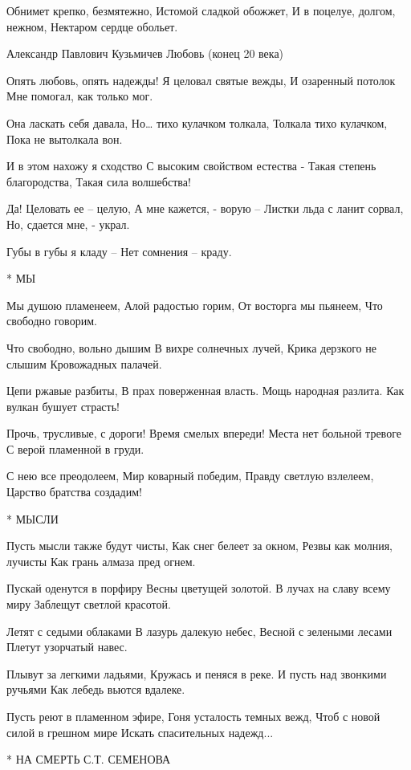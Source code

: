 Обнимет крепко, безмятежно,
Истомой сладкой обожжет,
И в поцелуе, долгом, нежном,
Нектаром сердце обольет.

Александр Павлович Кузьмичев
Любовь (конец 20 века)

Опять любовь, опять надежды!
Я целовал святые вежды,
И озаренный потолок
Мне помогал, как только мог.

Она ласкать себя давала,
Но… тихо кулачком толкала,
Толкала тихо кулачком,
Пока не вытолкала вон.

И в этом нахожу я сходство
С высоким свойством естества -
Такая степень благородства,
Такая сила волшебства!

Да! Целовать ее – целую,
А мне кажется, - ворую –
Листки льда с ланит сорвал,
Но, сдается мне, - украл.

Губы в губы я кладу –
Нет сомнения – краду.


* МЫ

Мы душою пламенеем,
Алой радостью горим,
От восторга мы пьянеем,
Что свободно говорим.

Что свободно, вольно дышим
В вихре солнечных лучей,
Крика дерзкого не слышим
Кровожадных палачей.

Цепи ржавые разбиты,
В прах поверженная власть.
Мощь народная разлита.
Как вулкан бушует страсть!

Прочь, трусливые, с дороги!
Время смелых впереди!
Места нет больной тревоге
С верой пламенной в груди.

С нею все преодолеем,
Мир коварный победим,
Правду светлую взлелеем,
Царство братства создадим!


* МЫСЛИ

Пусть мысли также будут чисты,
          Как снег белеет за окном,
Резвы как молния, лучисты
          Как грань алмаза пред огнем.

Пускай оденутся в порфиру
          Весны цветущей золотой.
В лучах на славу всему миру
          Заблещут светлой красотой.

Летят с седыми облаками
          В лазурь далекую небес,
Весной с зелеными лесами
          Плетут узорчатый навес.

Плывут за легкими ладьями,
          Кружась и пеняся в реке.
И пусть над звонкими ручьями
          Как лебедь вьются вдалеке.

Пусть реют в пламенном эфире,
          Гоня усталость темных вежд,
Чтоб с новой силой в грешном мире
          Искать спасительных надежд...


* НА СМЕРТЬ С.Т. СЕМЕНОВА

